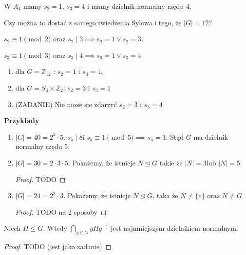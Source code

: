 \begin{remark}	
	W $A_4$ mamy $s_2=1$, $s_3=4$ i mamy dzielnik normalny rzędu 4.
	\begin{question}	
		Czy można to dostać z samego twiedzenia Sylowa i tego, że $\left| G \right| =12$?
	\end{question}
	$s_2 \equiv 1 \pmod{2} $ oraz $s_2\mid 3\implies s_2=1 \lor s_2=3$,

	$s_3 \equiv 1 \pmod{3} $ oraz $s_3\mid 4\implies s_3=1 \lor s_3=4$

	\begin{enumerate}[label=(\roman*)]
		\item dla $G=\mathbb{Z}_{12}$ : $s_2=1$ i $s_3=1$,
		\item dla $G=S_3\times \mathbb{Z}_{2}$: $s_2=3$ i $s_3=1$ 
		\item (ZADANIE) Nie moze sie zdarzyć $s_2=3$ i $s_3=4$
	\end{enumerate}
\end{remark} 
\textbf{Przykłady} 

\begin{enumerate}[label=\alph*)]
	\item $\left| G \right| = 40 = 2^3\cdot 5$. $s_5\mid 8$i $ s_5 \equiv 1 \pmod{5} \implies s_5=1$. Stąd $G$ ma dzielnik normalny rzędu 5.
	\item $\left| G \right| = 30 = 2\cdot 3\cdot 5$. Pokażemy, że istnieje $N\unlhd G$ takie że $\left| N \right| = 3 $lub $\left| N \right| = 5$ 
		\begin{proof}
			TODO
		\end{proof} 
	\item $\left| G \right| = 24 = 2^3\cdot 3$. Pokażemy, że istnieje $N\unlhd G$, taka że $N\neq \{e\} $ oraz $N\neq G$
		\begin{proof}
			TODO na 2 sposoby
		\end{proof} 
\end{enumerate}
\begin{remark}
	Niech $H\le G$. Wtedy $\bigcap_{g\in G} gHg^{-1}$ jest najmniejszym dzielnikiem normalnym.
\end{remark} 
\begin{proof}
	TODO (jest jako zadanie)
\end{proof} 
